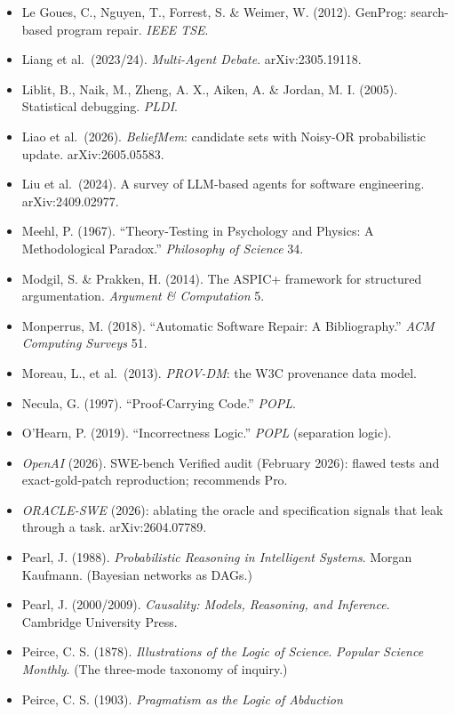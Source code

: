 \documentclass[
  10pt,
]{article}
\begin{document}
\begin{itemize}
  Laurie, B., et al.~\emph{Certificate Transparency}. RFC 9162.
\item
  Le Goues, C., Nguyen, T., Forrest, S. \& Weimer, W. (2012). GenProg:
  search-based program repair. \emph{IEEE TSE}.
\item
  Liang et al.~(2023/24). \emph{Multi-Agent Debate}. arXiv:2305.19118.
\item
  Liblit, B., Naik, M., Zheng, A. X., Aiken, A. \& Jordan, M. I. (2005).
  Statistical debugging. \emph{PLDI}.
\item
  Liao et al.~(2026). \emph{BeliefMem}: candidate sets with Noisy-OR
  probabilistic update. arXiv:2605.05583.
\item
  Liu et al.~(2024). A survey of LLM-based agents for software
  engineering. arXiv:2409.02977.
\item
  Meehl, P. (1967). ``Theory-Testing in Psychology and Physics: A
  Methodological Paradox.'' \emph{Philosophy of Science} 34.
\item
  Modgil, S. \& Prakken, H. (2014). The ASPIC+ framework for structured
  argumentation. \emph{Argument \& Computation} 5.
\item
  Monperrus, M. (2018). ``Automatic Software Repair: A Bibliography.''
  \emph{ACM Computing Surveys} 51.
\item
  Moreau, L., et al.~(2013). \emph{PROV-DM}: the W3C provenance data
  model.
\item
  Necula, G. (1997). ``Proof-Carrying Code.'' \emph{POPL}.
\item
  O'Hearn, P. (2019). ``Incorrectness Logic.'' \emph{POPL} (separation
  logic).
\item
  \emph{OpenAI} (2026). SWE-bench Verified audit (February 2026): flawed
  tests and exact-gold-patch reproduction; recommends Pro.
\item
  \emph{ORACLE-SWE} (2026): ablating the oracle and specification
  signals that leak through a task. arXiv:2604.07789.
\item
  Pearl, J. (1988). \emph{Probabilistic Reasoning in Intelligent
  Systems}. Morgan Kaufmann. (Bayesian networks as DAGs.)
\item
  Pearl, J. (2000/2009). \emph{Causality: Models, Reasoning, and
  Inference}. Cambridge University Press.
\item
  Peirce, C. S. (1878). \emph{Illustrations of the Logic of Science}.
  \emph{Popular Science Monthly}. (The three-mode taxonomy of inquiry.)
\item
  Peirce, C. S. (1903). \emph{Pragmatism as the Logic of Abduction}

\end{itemize}
\end{document}
